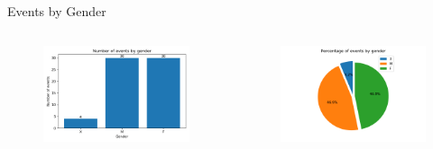 \documentclass[aspectratio=169, xcolor=dvipsnames]{beamer}
\begin{document}
\begin{frame}{Events by Gender}
\begin{columns}[c]
\begin{column}{.5\textwidth}
\begin{figure}
    \centering
    \includegraphics[width=\textwidth]{img/eventsbygender.png}
\end{figure}
\end{column}

\begin{column}{.5\textwidth}
\begin{figure}
    \centering
    \includegraphics[width=\textwidth]{img/eventsbygender-pie.png}
\end{figure}
\end{column}
\end{columns}
\end{frame}
\end{document}
